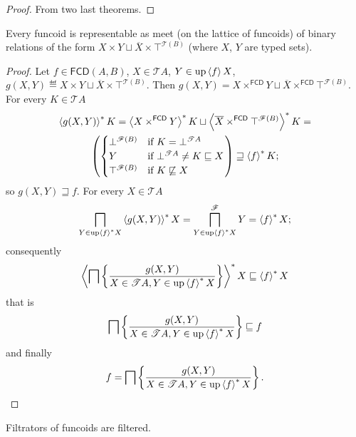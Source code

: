 \begin{proof}
From two last theorems.\end{proof}
\begin{lem}
\label{fcd-rep}Every funcoid is representable as meet (on the lattice
of funcoids) of binary relations of the form
$X\times Y\sqcup\overline{X}\times\top^{\mathscr{T}(B)}$ (where $X$, $Y$ are typed sets).\end{lem}
\begin{proof}
Let $f\in\mathsf{FCD}(A,B)$, $X\in\mathscr{T}A$, $Y\in\operatorname{up}\left\langle f\right\rangle X$,
$g(X,Y)\eqdef X\times Y\sqcup\overline{X}\times\top^{\mathscr{T}(B)}$.
Then $g(X,Y)=X\times^{\mathsf{FCD}}Y\sqcup\overline{X}\times^{\mathsf{FCD}}\top^{\mathscr{F}(B)}$.
For every $K\in\mathscr{T}A$
\begin{multline*}
\left\langle g(X,Y)\right\rangle ^{\ast}K=\left\langle X\times^{\mathsf{FCD}}Y\right\rangle ^{\ast}K\sqcup\left\langle \overline{X}
\times^{\mathsf{FCD}}\top^{\mathscr{F}(B)}\right\rangle ^{\ast}K=\\
\left(\begin{cases}
\bot^{\mathscr{F}(B)} & \text{if }K=\bot^{\mathscr{T}A}\\
Y & \text{if }\bot^{\mathscr{T}A}\ne K\sqsubseteq X\\
\top^{\mathscr{F}(B)} & \text{if }K\not\sqsubseteq X
\end{cases}\right)\sqsupseteq\left\langle f\right\rangle ^{\ast}K;
\end{multline*}
so $g(X,Y)\sqsupseteq f$. For every $X\in\mathscr{T}A$
\[
\bigsqcap_{Y\in\operatorname{up}\left\langle f\right\rangle ^{\ast}X}\left\langle g(X,Y)\right\rangle ^{\ast}X=\bigsqcap^{\mathscr{F}}_{Y\in\operatorname{up}\left\langle f\right\rangle ^{\ast}X}Y=\left\langle f\right\rangle ^{\ast}X;
\]
consequently
\[
\left\langle \bigsqcap\left\{ \frac{g(X,Y)}{X\in\mathscr{T}A,Y\in\operatorname{up}\left\langle f\right\rangle ^{\ast}X}\right\}\right\rangle ^{\ast}X\sqsubseteq\left\langle f\right\rangle ^{\ast}X
\]
that is
\[
\bigsqcap\left\{ \frac{g(X,Y)}{X\in\mathscr{T}A,Y\in\operatorname{up}\left\langle f\right\rangle ^{\ast}X}\right\}\sqsubseteq f
\]
 and finally
\[
f=\bigsqcap\left\{ \frac{g(X,Y)}{X\in\mathscr{T}A,Y\in\operatorname{up}\left\langle f\right\rangle ^{\ast}X}\right\}.
\]
\end{proof}
\begin{cor}
\label{fcd-filtered}Filtrators of funcoids are filtered.
\end{cor}

